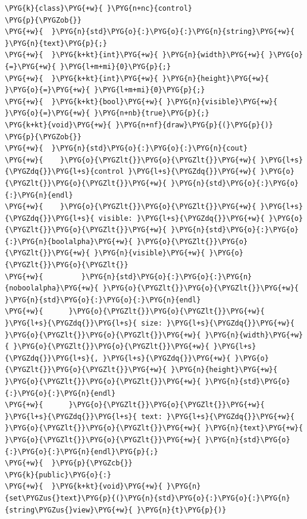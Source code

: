 \begin{codeblockbg}
\begin{Verbatim}[commandchars=\\\{\},breaklines=true,breakanywhere=true,fontsize=\codefont,xleftmargin=17bp]
\PYG{k}{class}\PYG{+w}{ }\PYG{n+nc}{control}
\PYG{p}{\PYGZob{}}
\PYG{+w}{  }\PYG{n}{std}\PYG{o}{:}\PYG{o}{:}\PYG{n}{string}\PYG{+w}{ }\PYG{n}{text}\PYG{p}{;}
\PYG{+w}{  }\PYG{k+kt}{int}\PYG{+w}{ }\PYG{n}{width}\PYG{+w}{ }\PYG{o}{=}\PYG{+w}{ }\PYG{l+m+mi}{0}\PYG{p}{;}
\PYG{+w}{  }\PYG{k+kt}{int}\PYG{+w}{ }\PYG{n}{height}\PYG{+w}{ }\PYG{o}{=}\PYG{+w}{ }\PYG{l+m+mi}{0}\PYG{p}{;}
\PYG{+w}{  }\PYG{k+kt}{bool}\PYG{+w}{ }\PYG{n}{visible}\PYG{+w}{ }\PYG{o}{=}\PYG{+w}{ }\PYG{n+nb}{true}\PYG{p}{;}
\PYG{k+kt}{void}\PYG{+w}{ }\PYG{n+nf}{draw}\PYG{p}{(}\PYG{p}{)}
\PYG{p}{\PYGZob{}}
\PYG{+w}{  }\PYG{n}{std}\PYG{o}{:}\PYG{o}{:}\PYG{n}{cout}
\PYG{+w}{    }\PYG{o}{\PYGZlt{}}\PYG{o}{\PYGZlt{}}\PYG{+w}{ }\PYG{l+s}{\PYGZdq{}}\PYG{l+s}{control }\PYG{l+s}{\PYGZdq{}}\PYG{+w}{ }\PYG{o}{\PYGZlt{}}\PYG{o}{\PYGZlt{}}\PYG{+w}{ }\PYG{n}{std}\PYG{o}{:}\PYG{o}{:}\PYG{n}{endl}
\PYG{+w}{    }\PYG{o}{\PYGZlt{}}\PYG{o}{\PYGZlt{}}\PYG{+w}{ }\PYG{l+s}{\PYGZdq{}}\PYG{l+s}{ visible: }\PYG{l+s}{\PYGZdq{}}\PYG{+w}{ }\PYG{o}{\PYGZlt{}}\PYG{o}{\PYGZlt{}}\PYG{+w}{ }\PYG{n}{std}\PYG{o}{:}\PYG{o}{:}\PYG{n}{boolalpha}\PYG{+w}{ }\PYG{o}{\PYGZlt{}}\PYG{o}{\PYGZlt{}}\PYG{+w}{ }\PYG{n}{visible}\PYG{+w}{ }\PYG{o}{\PYGZlt{}}\PYG{o}{\PYGZlt{}}
\PYG{+w}{         }\PYG{n}{std}\PYG{o}{:}\PYG{o}{:}\PYG{n}{noboolalpha}\PYG{+w}{ }\PYG{o}{\PYGZlt{}}\PYG{o}{\PYGZlt{}}\PYG{+w}{ }\PYG{n}{std}\PYG{o}{:}\PYG{o}{:}\PYG{n}{endl}
\PYG{+w}{      }\PYG{o}{\PYGZlt{}}\PYG{o}{\PYGZlt{}}\PYG{+w}{ }\PYG{l+s}{\PYGZdq{}}\PYG{l+s}{ size: }\PYG{l+s}{\PYGZdq{}}\PYG{+w}{ }\PYG{o}{\PYGZlt{}}\PYG{o}{\PYGZlt{}}\PYG{+w}{ }\PYG{n}{width}\PYG{+w}{ }\PYG{o}{\PYGZlt{}}\PYG{o}{\PYGZlt{}}\PYG{+w}{ }\PYG{l+s}{\PYGZdq{}}\PYG{l+s}{, }\PYG{l+s}{\PYGZdq{}}\PYG{+w}{ }\PYG{o}{\PYGZlt{}}\PYG{o}{\PYGZlt{}}\PYG{+w}{ }\PYG{n}{height}\PYG{+w}{ }\PYG{o}{\PYGZlt{}}\PYG{o}{\PYGZlt{}}\PYG{+w}{ }\PYG{n}{std}\PYG{o}{:}\PYG{o}{:}\PYG{n}{endl}
\PYG{+w}{      }\PYG{o}{\PYGZlt{}}\PYG{o}{\PYGZlt{}}\PYG{+w}{ }\PYG{l+s}{\PYGZdq{}}\PYG{l+s}{ text: }\PYG{l+s}{\PYGZdq{}}\PYG{+w}{ }\PYG{o}{\PYGZlt{}}\PYG{o}{\PYGZlt{}}\PYG{+w}{ }\PYG{n}{text}\PYG{+w}{ }\PYG{o}{\PYGZlt{}}\PYG{o}{\PYGZlt{}}\PYG{+w}{ }\PYG{n}{std}\PYG{o}{:}\PYG{o}{:}\PYG{n}{endl}\PYG{p}{;}
\PYG{+w}{  }\PYG{p}{\PYGZcb{}}
\PYG{k}{public}\PYG{o}{:}
\PYG{+w}{  }\PYG{k+kt}{void}\PYG{+w}{ }\PYG{n}{set\PYGZus{}text}\PYG{p}{(}\PYG{n}{std}\PYG{o}{:}\PYG{o}{:}\PYG{n}{string\PYGZus{}view}\PYG{+w}{ }\PYG{n}{t}\PYG{p}{)}

\end{Verbatim}
\end{codeblockbg}
